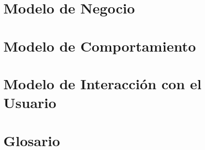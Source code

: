 \documentclass[12pt]{book}
\begin{document}
\chapter{Modelo de Negocio}\label{chp:modeloNegocios}
\chapter{Modelo de Comportamiento}
\chapter{Modelo de Interacción con el Usuario}

\newpage
\renewcommand{\bibname}{Referencias}
%
%


\chapter{Glosario}
\end{document}
